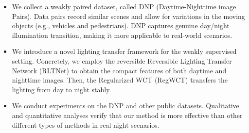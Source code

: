 \documentclass{article}
\begin{document}


\begin{itemize}[itemsep=2pt,parsep=0pt,topsep=3pt,leftmargin=*,itemindent=0em]
    \item We collect a weakly paired dataset, called DNP (Daytime-Nighttime image Pairs). Data pairs record similar scenes and allow for variations in the moving objects (e.g., vehicles and pedestrians). DNP captures genuine day/night illumination transition, making it more applicable to real-world scenarios.


    
    \item We introduce a novel lighting transfer framework for the weakly supervised setting. Concretely, we employ the reversible Reversible Lighting Transfer Network (RLTNet) to obtain the compact features of both daytime and nighttime images. Then, the Regularized WCT (RegWCT) transfers the lighting from day to night stably.
     


    \item We conduct experiments on the DNP and other public datasets. Qualitative and quantitative analyses verify that our method is more effective than other different types of methods in real night scenarios.
    
    
    


\end{itemize}
\end{document}
